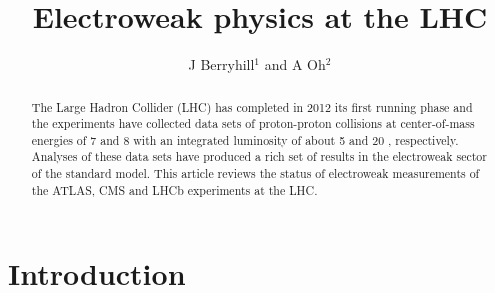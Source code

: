 \documentclass[12pt]{iopart}
\begin{document}
\title[Electroweak physics at the LHC]{Electroweak physics at the LHC}
\author{J Berryhill$^1$ and A Oh$^2$}

\address{$^1$ Fermi National Accelerator Laboratory, Batavia, IL, USA}
\address{$^2$ School of Physics and Astronomy, University of Manchester, Manchester, UK}


\begin{abstract}
The Large Hadron Collider (LHC) has completed in 2012 its first
running phase and the experiments have collected data sets of proton-proton
collisions at center-of-mass energies of 7 and 8 \TeV\xspace with an
integrated luminosity of about 5 and 20 \ifb, respectively.  Analyses
of these data sets have produced a rich set of results in the
electroweak sector of the standard model. This article reviews the
status of electroweak measurements of the ATLAS, CMS and LHCb experiments at
the LHC.
\end{abstract}

%
%
\submitto{\jpg}
%
\maketitle
%
%


\section{Introduction}

%
\end{document}

